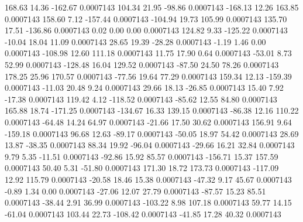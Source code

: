       168.63       14.36     -162.67     0.0007143
      104.34       21.95      -98.86     0.0007143
     -168.13       12.26      163.85     0.0007143
      158.60        7.12     -157.44     0.0007143
     -104.94       19.73      105.99     0.0007143
      135.70       17.51     -136.86     0.0007143
        0.02        0.00        0.00     0.0007143
      124.82        9.33     -125.22     0.0007143
      -10.04       18.04       11.09     0.0007143
       28.65       19.39      -28.28     0.0007143
       -1.19        1.46        0.00     0.0007143
     -108.98       12.60      111.18     0.0007143
       11.75       17.90        0.64     0.0007143
      -53.01        8.73       52.99     0.0007143
     -128.48       16.04      129.52     0.0007143
      -87.50       24.50       78.26     0.0007143
      178.25       25.96      170.57     0.0007143
      -77.56       19.64       77.29     0.0007143
      159.34       12.13     -159.39     0.0007143
      -11.03       20.48        9.24     0.0007143
       29.66       18.13      -26.85     0.0007143
       15.40        7.92      -17.38     0.0007143
      119.42        4.12     -118.52     0.0007143
      -85.62       12.55       84.80     0.0007143
      165.88       18.74     -171.25     0.0007143
     -134.67       16.33      139.15     0.0007143
      -86.38       12.16      110.22     0.0007143
      -64.48       14.24       64.97     0.0007143
      -21.66       17.50       30.62     0.0007143
      156.91        9.64     -159.18     0.0007143
       96.68       12.63      -89.17     0.0007143
      -50.05       18.97       54.42     0.0007143
       28.69       13.87      -38.35     0.0007143
       88.34       19.92      -96.04     0.0007143
      -29.66       16.21       32.84     0.0007143
        9.79        5.35      -11.51     0.0007143
      -92.86       15.92       85.57     0.0007143
     -156.71       15.37      157.59     0.0007143
       50.40        5.31      -51.80     0.0007143
      171.30       18.72      173.73     0.0007143
     -117.09       12.92      115.79     0.0007143
      -20.58       18.46       15.38     0.0007143
      -47.32        9.17       45.67     0.0007143
       -0.89        1.34        0.00     0.0007143
      -27.06       12.07       27.79     0.0007143
      -87.57       15.23       85.51     0.0007143
      -38.44        2.91       36.99     0.0007143
     -103.22        8.98      107.18     0.0007143
       59.77       14.15      -61.04     0.0007143
      103.44       22.73     -108.42     0.0007143
      -41.85       17.28       40.32     0.0007143
